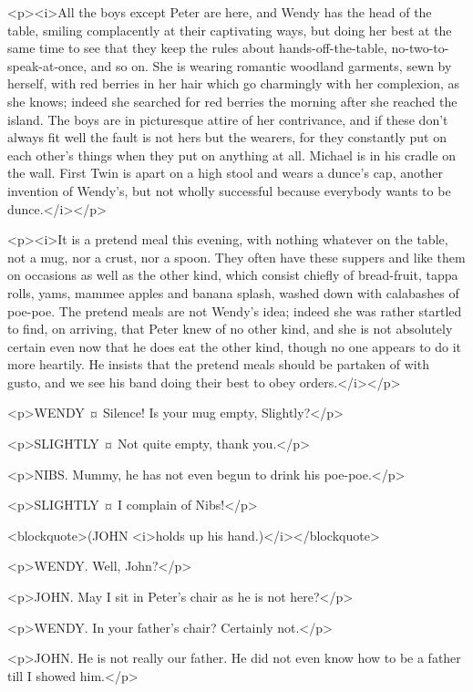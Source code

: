 <p><i>All the boys except Peter are here, and Wendy has the head of the table, smiling complacently at their captivating ways, but doing her best at the same time to see that they keep the rules about hands-off-the-table, no-two-to-speak-at-once, and so on. She is wearing romantic woodland garments, sewn by herself, with red berries in her hair which go charmingly with her complexion, as she knows; indeed she searched for red berries the morning after she reached the island. The boys are in picturesque attire of her contrivance, and if these don't always fit well the fault is not hers but the wearers, for they constantly put on each other's things when they put on anything at all. Michael is in his cradle on the wall. First Twin is apart on a high stool and wears a dunce's cap, another invention of Wendy's, but not wholly successful because everybody wants to be dunce.</i></p>

<p><i>It is a pretend meal this evening, with nothing whatever on the table, not a mug, nor a crust, nor a spoon. They often have these suppers and like them on occasions as well as the other kind, which consist chiefly of bread-fruit, tappa rolls, yams, mammee apples and banana splash, washed down with calabashes of poe-poe. The pretend meals are not Wendy's idea; indeed she was rather startled to find, on arriving, that Peter knew of no other kind, and she is not absolutely certain even now that he does eat the other kind, though no one appears to do it more heartily. He insists that the pretend meals should be partaken of with gusto, and we see his band doing their best to obey orders.</i></p>

<p>WENDY ¤
Silence! Is your mug empty, Slightly?</p>

<p>SLIGHTLY ¤
Not quite empty, thank you.</p>

<p>NIBS. Mummy, he has not even begun to drink his poe-poe.</p>

<p>SLIGHTLY ¤
I complain of Nibs!</p>

<blockquote>(JOHN <i>holds up his hand.)</i></blockquote>

<p>WENDY. Well, John?</p>

<p>JOHN. May I sit in Peter's chair as he is not here?</p>

<p>WENDY. In your father's chair? Certainly not.</p>

<p>JOHN. He is not really our father. He did not even know how to be a father till I showed him.</p>

